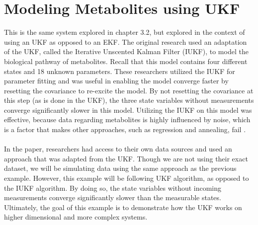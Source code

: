 \section{Modeling Metabolites using UKF}
\label{Modeling Metabolites using UKF}




\noindent This is the same system explored in chapter 3.2, but explored in the context of using an UKF as opposed to an EKF. The original research used an adaptation of the UKF, called the Iterative Unscented Kalman Filter (IUKF), to model the biological pathway of metabolites. Recall that this model contains four different states and 18 unknown parameters. These researchers utilized the IUKF for parameter fitting and was useful in enabling the model converge faster by resetting the covariance to re-excite the model. By not resetting the covariance at this step (as is done in the UKF), the three state variables without measurements converge significantly slower in this model. Utilizing the IUKF on this model was effective, because data regarding metabolites is highly influenced by noise, which is a factor that makes other approaches, such as regression and annealing, fail \cite{article5}. \\ 

\noindent  \\ 

\noindent In the paper, researchers had access to their own data sources and used an approach that was adapted from the UKF. Though we are not using their exact dataset, we will be simulating data using the same approach as the previous example. However, this example will be following UKF algorithm, as opposed to the IUKF algorithm. By doing so, the state variables without incoming measurements converge significantly slower than the measurable states. Ultimately, the goal of this example is to demonstrate how the UKF works on higher dimensional and more complex systems. \\

